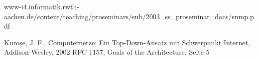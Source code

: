 \documentclass[11pt,a4paper]{article}
\begin{document}
\pagebreak
\begin{thebibliography}{10}
	\begin{small}
		www-i4.informatik.rwth-aachen.de/content/teaching/proseminars/sub/2003\_ss\_proseminar\_docs/snmp.pdf
	\end{small}
		Kurose, J. F.,
		Computernetze: Ein Top-Down-Ansatz mit Schwerpunkt Internet,
		Addison-Wesley,
		2002
		RFC 1157, Goals of the Architecture, Seite 5
\end{thebibliography}
\end{document}
